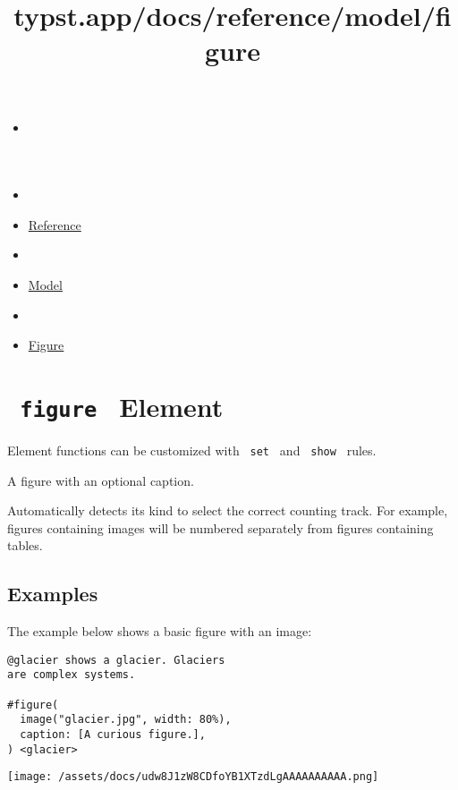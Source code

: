 \title{typst.app/docs/reference/model/figure}

\begin{itemize}
\tightlist
\item
  \href{/docs}{}
\item
  
\item
  \href{/docs/reference/}{Reference}
\item
  
\item
  \href{/docs/reference/model/}{Model}
\item
  
\item
  \href{/docs/reference/model/figure/}{Figure}
\end{itemize}

\section{\texorpdfstring{\texttt{\ figure\ } {{ Element
}}}{ figure   Element }}\label{summary}

\label{element-tooltip}
Element functions can be customized with \texttt{\ set\ } and
\texttt{\ show\ } rules.

A figure with an optional caption.

Automatically detects its kind to select the correct counting track. For
example, figures containing images will be numbered separately from
figures containing tables.

\subsection{Examples}\label{examples}

The example below shows a basic figure with an image:

\begin{verbatim}
@glacier shows a glacier. Glaciers
are complex systems.

#figure(
  image("glacier.jpg", width: 80%),
  caption: [A curious figure.],
) <glacier>
\end{verbatim}

\texttt{[image: /assets/docs/udw8J1zW8CDfoYB1XTzdLgAAAAAAAAAA.png]}

